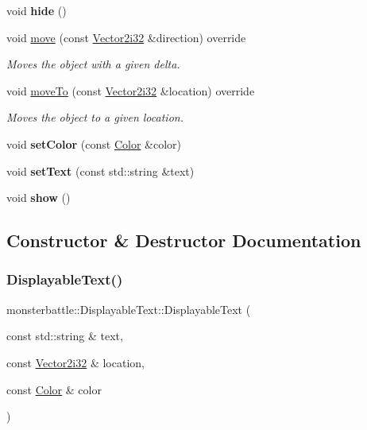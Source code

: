 \begin{DoxyCompactItemize}
void {\bfseries hide} ()
\item 
void \hyperlink{classmonsterbattle_1_1DisplayableText_adeeb4a77f3137a943cbea2baaccef657}{move} (const \hyperlink{structmonsterbattle_1_1Vector}{Vector2i32} \&direction) override
\begin{DoxyCompactList}\small\item\em Moves the object with a given delta. \end{DoxyCompactList}\item 
void \hyperlink{classmonsterbattle_1_1DisplayableText_afa4e1b76469663073b133d6358329887}{move\+To} (const \hyperlink{structmonsterbattle_1_1Vector}{Vector2i32} \&location) override
\begin{DoxyCompactList}\small\item\em Moves the object to a given location. \end{DoxyCompactList}\item 
\mbox{\label{classmonsterbattle_1_1DisplayableText_a102201fb6e66a5a01c30ba4776dfd6fd}} 
void {\bfseries set\+Color} (const \hyperlink{structmonsterbattle_1_1Color}{Color} \&color)
\item 
\mbox{\label{classmonsterbattle_1_1DisplayableText_a5f746fa424fabd0fb911963081d6920b}} 
void {\bfseries set\+Text} (const std\+::string \&text)
\item 
\mbox{\label{classmonsterbattle_1_1DisplayableText_ad55ca801bdc8be0e20d1dc90029fe035}} 
void {\bfseries show} ()
\end{DoxyCompactItemize}


\subsection{Constructor \& Destructor Documentation}
\mbox{\label{classmonsterbattle_1_1DisplayableText_ac900c6f68dba204ffa012446e72b66b2}} 
\subsubsection{\texorpdfstring{Displayable\+Text()}{DisplayableText()}}
{\footnotesize\ttfamily monsterbattle\+::\+Displayable\+Text\+::\+Displayable\+Text (\begin{DoxyParamCaption}\item[{const std\+::string \&}]{text,  }\item[{const \hyperlink{structmonsterbattle_1_1Vector}{Vector2i32} \&}]{location,  }\item[{const \hyperlink{structmonsterbattle_1_1Color}{Color} \&}]{color }\end{DoxyParamCaption})}



